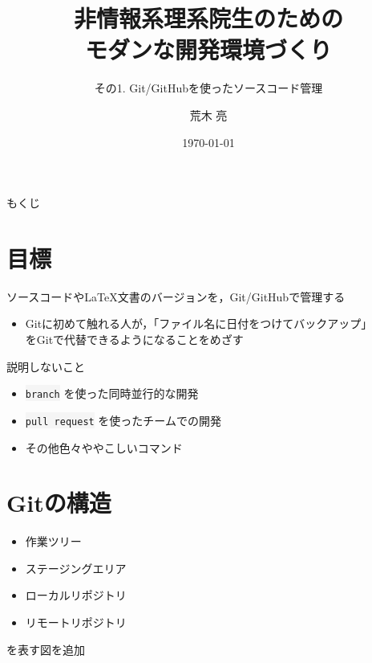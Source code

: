 \documentclass[12pt,dvipdfmx,svgnames,uplatex,aspectratio=169]{beamer}
\title{非情報系理系院生のための \\
  モダンな開発環境づくり}
\subtitle{その1. Git/GitHubを使ったソースコード管理}
\author{荒木 亮}
\institute{阪大院基礎工・後藤研}
\date{\today}
\newcommand{\git}[1]{{\colorbox{WhiteSmoke}{\texttt{#1}}}}  %
\begin{document}
\frame{\maketitle}
\begin{frame}{もくじ}
  \tableofcontents
\end{frame}

\section{目標}
\begin{frame}{\insertsection}
  \begin{screen}
    \centering
    ソースコードやLaTeX文書のバージョンを，Git/GitHubで管理する
  \end{screen}

  \begin{itemize}
    \item Gitに初めて触れる人が，「ファイル名に日付をつけてバックアップ」\\をGitで代替できるようになることをめざす
  \end{itemize}

  \begin{alertblock}{説明しないこと}
    \begin{itemize}
      \item \git{branch} を使った同時並行的な開発
      \item \git{pull request} を使ったチームでの開発
      \item その他色々ややこしいコマンド
    \end{itemize}
  \end{alertblock}
\end{frame}

\section{Gitの構造}
\begin{frame}{\insertsection}
  \begin{screen}
    \begin{itemize}
      \item 作業ツリー
      \item ステージングエリア
      \item ローカルリポジトリ
      \item リモートリポジトリ
    \end{itemize}
    を表す図を追加
  \end{screen}
\end{frame}
\end{document}
